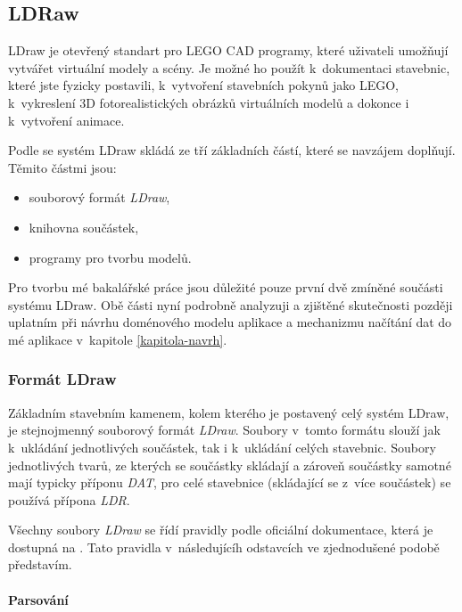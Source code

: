 \subsection{LDRaw}\label{ldraw-sekce}  
   
LDraw je otevřený standart pro LEGO \gls{CAD} programy, které uživateli umožňují vytvářet virtuální modely a scény. Je možné ho použít k~dokumentaci stavebnic, které jste fyzicky postavili, k~vytvoření stavebních pokynů jako LEGO, k~vykreslení 3D fotorealistických obrázků virtuálních modelů a dokonce i k~vytvoření animace. \autocite{ldraw:homepage}  

Podle \autocite[s.~30]{legobook} se systém LDraw skládá ze tří základních částí, které se navzájem doplňují. Těmito částmi jsou: 

\begin{itemize}
    \item souborový formát \textit{LDraw},
    \item knihovna součástek,
    \item programy pro tvorbu modelů. 
\end{itemize}

Pro tvorbu mé bakalářské práce jsou důležité pouze první dvě zmíněné součásti systému LDraw. Obě části nyní podrobně analyzuji a zjištěné skutečnosti později uplatním při návrhu doménového modelu aplikace a mechanizmu načítání dat do mé aplikace v~kapitole \ref{kapitola-navrh}.
    
    \subsubsection{Formát LDraw}\label{ldraw-format}
    
    Základním stavebním kamenem, kolem kterého je postavený celý systém LDraw, je stejnojmenný souborový formát \textit{LDraw}. Soubory v~tomto formátu slouží jak k~ukládání jednotlivých součástek, tak i k~ukládání celých stavebnic. Soubory jednotlivých tvarů, ze kterých se součástky skládají a zároveň součástky samotné mají typicky příponu \textit{DAT}, pro celé stavebnice (skládající se z~více součástek) se používá přípona \textit{LDR}.
    
    Všechny soubory \textit{LDraw} se řídí pravidly podle oficiální dokumentace, která je dostupná na \autocite{ldraw:file:documentation}. Tato pravidla v~následujícíh odstavcích ve zjednodušené podobě představím.

        \paragraph{Parsování}\mbox{}


